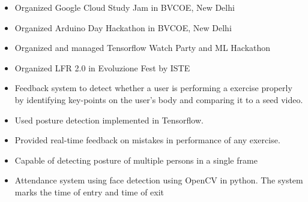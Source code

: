 
\begin{itemize}
    \item Organized Google Cloud Study Jam in BVCOE, New Delhi
    \item Organized Arduino Day Hackathon in BVCOE, New Delhi
    \item Organized and managed Tensorflow Watch Party and ML Hackathon
    \item Organized LFR 2.0 in Evoluzione Fest by ISTE
\end{itemize}








\begin{itemize}
\item Feedback system to detect whether a user is performing a exercise properly by identifying key-points on the user's body and comparing it to a seed video.
\item Used posture detection implemented in \newline Tensorflow.
\item Provided real-time feedback on mistakes in performance of any exercise. 
\item Capable of detecting posture of multiple \newline persons in a single frame
\end{itemize}

\smallskip

\begin{itemize}
\item Attendance system using face detection using OpenCV in python. The system marks the time of entry and time of exit 
\end{itemize}
\smallskip

